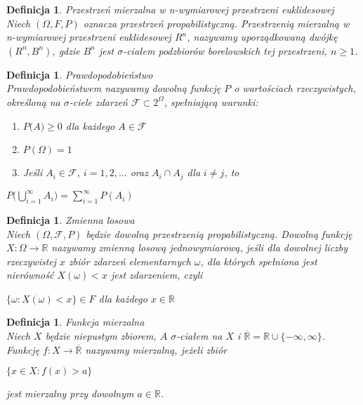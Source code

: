 \documentclass[12pt,a4paper]{report}
\newtheorem{definition}[theorem]{Definicja}
\begin{document}
\begin{definition}{Przestrzeń mierzalna w n-wymiarowej przestrzeni euklidesowej \cite[Rozdział 1]{bartoszewicz1996}\\}
Niech $(\Omega, F, P)$ oznacza przestrzeń propabilistyczną. Przestrzenią mierzalną w n-wymiarowej przestrzeni euklidesowej $R^n$, nazywamy uporządkowaną dwójkę $(R^n, \textit{B}^n)$, gdzie $\textit{B}^n$ jest $\sigma$-ciałem podzbiorów borelowskich tej przestrzeni, $n \geq 1$. \\
\end{definition}


\begin{definition}{Prawdopodobieństwo \cite[w oparciu o rozdział 1.1]{krysicki1999}\\}
Prawdopodobieństwem nazywamy dowolną funkcję $P$ o wartościach rzeczywistych, określoną na $\sigma$-ciele zdarzeń $\mathcal{F} \subset 2^\Omega$, spełniającą warunki: \\
\begin{enumerate}
\item $\textit{P(A)} \geq 0$ dla każdego $\textit{A} \in \mathcal{F}$
\item $\textit{P}(\Omega) = 1$
\item Jeśli $\textit{A}_{i} \in \mathcal{F}$, $i= 1, 2, ...$ oraz $A_{i} \cap A_{j}$ dla $i \neq j$, to 
\end{enumerate}
\begin{center}
$P \Big(\bigcup\limits_{i=1}^{\infty} A_{i} \Big)=\sum_{i=1}^{\infty} P(A_{i}) $\\
\end{center}
\end{definition}

\begin{definition}{Zmienna losowa \cite[Rozdział 2.1]{krysicki1999}\\}
Niech $(\Omega, \mathcal{F}, P)$ będzie dowolną przestrzenią propabilistyczną. Dowolną funkcję $\textit{X} : \Omega \rightarrow \mathbb{R}$ nazywamy zmienną losową jednowymiarową, jeśli dla dowolnej liczby rzeczywistej $x$ zbiór zdarzeń elementarnych $\omega$, dla których spełniona jest nierówność $X(\omega)< x$ jest zdarzeniem, czyli 
\begin{center}
$\{\omega: X(\omega) < x \} \in \textit{F}$ dla każdego $x \in \mathbb{R}$\\
\end{center}
\end{definition}


\begin{definition}{Funkcja mierzalna \cite[w oparciu o rozdział 8.2]{rudnicki2006}\\}
Niech $X$ będzie niepustym zbiorem, $A$  $\sigma$-ciałem na $X$ i $\overline{\mathbb{R}} = \mathbb{R} \cup \{-\infty, \infty \}$. Funkcję $f: X \rightarrow \overline{\mathbb{R}}$ nazywamy mierzalną, jeżeli zbiór
\begin{center}
$\{ x \in X: f(x) > a \}$
\end{center}
jest mierzalny przy dowolnym $a \in \mathbb{R}$.\\
\end{definition}
\end{document}
